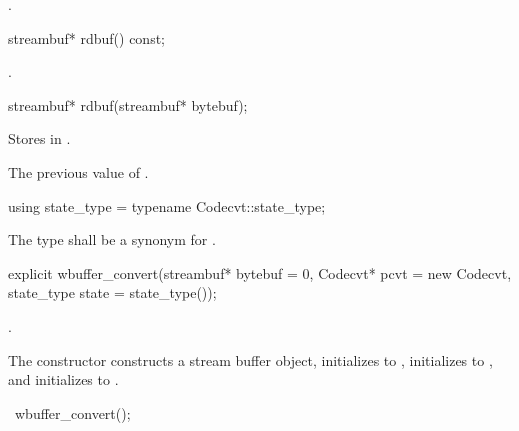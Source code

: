 \begin{itemdescr}
\pnum
\returns {}.
\end{itemdescr}

%
\begin{itemdecl}
streambuf* rdbuf() const;
\end{itemdecl}

\begin{itemdescr}
\pnum
\returns {}.
\end{itemdescr}

%
\begin{itemdecl}
streambuf* rdbuf(streambuf* bytebuf);
\end{itemdecl}

\begin{itemdescr}
\pnum
\effects Stores  in .

\pnum
\returns The previous value of .
\end{itemdescr}

%
\begin{itemdecl}
using state_type = typename Codecvt::state_type;
\end{itemdecl}

\begin{itemdescr}
\pnum
The type shall be a synonym for .
\end{itemdescr}

%
\begin{itemdecl}
explicit wbuffer_convert(streambuf* bytebuf = 0,
    Codecvt* pcvt = new Codecvt, state_type state = state_type());
\end{itemdecl}

\begin{itemdescr}
\pnum
\requires
{}.

\pnum
\effects The constructor constructs a stream buffer object, initializes
 to , initializes 
to , and initializes  to .
\end{itemdescr}

%
\begin{itemdecl}
~wbuffer_convert();
\end{itemdecl}

